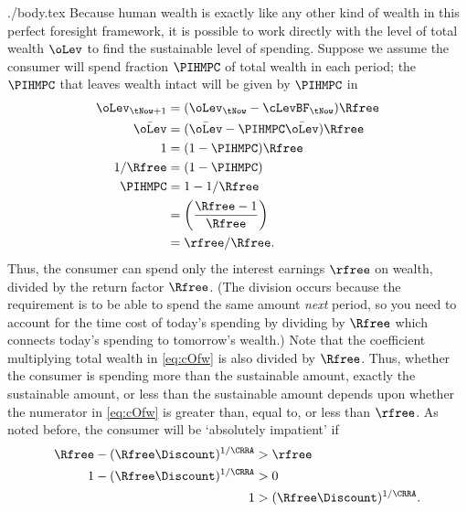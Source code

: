 \documentclass{handout}
\begin{document}
\begin{verbatimwrite}{./body.tex}
Because human wealth is exactly like any other kind of wealth in this 
perfect foresight framework, it is possible to work directly with the level of total 
wealth $\oLev$ to find the sustainable level of spending.  Suppose we assume the consumer will spend fraction 
$\PIHMPC$ of total wealth in each period; the 
$\PIHMPC$ that leaves wealth intact will be given by $\PIHMPC$ in
\begin{equation*}\begin{gathered}\begin{aligned}
        \oLev_{\tNow+1} & =  (\oLev_{\tNow}-\cLevBF_{\tNow})\Rfree
\\  \bar\oLev & =  (\bar\oLev-\PIHMPC \bar\oLev)\Rfree
\\      1 & =  (1-\PIHMPC)  \Rfree
\\      1/\Rfree & =  (1-\PIHMPC)
\\  \PIHMPC & =  1-1/\Rfree
\\  & =  \left(\frac{\Rfree -1}{\Rfree}\right)
\\  & =  \rfree/\Rfree \label{eq:PIHMPC}
.
\end{aligned}\end{gathered}\end{equation*}
Thus, the consumer can spend only the interest earnings $\rfree$ on 
wealth, divided by the return factor $\Rfree$.  (The division occurs because 
the requirement is to be able to spend the same amount {\it next} period,
so you need to account for the time cost of today's spending by dividing by $\Rfree$ which
connects today's spending to tomorrow's wealth.)
Note that the coefficient multiplying total wealth in \eqref{eq:cOfw}
is also divided by $\Rfree$.  Thus, whether the consumer is spending
more than the sustainable amount, exactly the sustainable amount, or
less than the sustainable amount depends upon whether the numerator in
\eqref{eq:cOfw} is greater than, equal to, or less than $\rfree$.  As noted before,
the consumer will be `absolutely impatient' if 
\begin{equation}\begin{gathered}\begin{aligned}
        \Rfree-(\Rfree\Discount)^{1/\CRRA} & >  \rfree  \\
        1-(\Rfree\Discount)^{1/\CRRA} & >  0  \notag \\
        1 & >  (\Rfree\Discount)^{1/\CRRA}. \notag
\end{aligned}\end{gathered}\end{equation}


\end{verbatimwrite}
\end{document}
